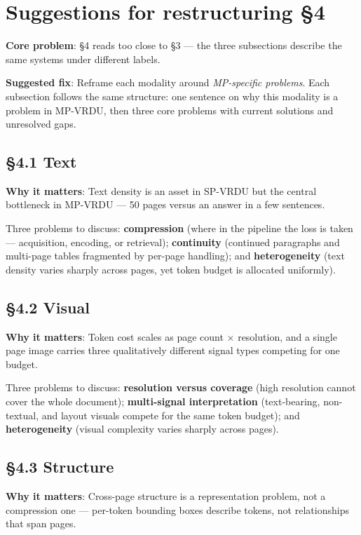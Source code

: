 \section*{Suggestions for restructuring §4}

\textbf{Core problem}: §4 reads too close to §3 --- the three subsections describe the same systems under different labels.

\textbf{Suggested fix}: Reframe each modality around \emph{MP-specific problems}. Each subsection follows the same structure: one sentence on why this modality is a problem in MP-VRDU, then three core problems with current solutions and unresolved gaps.

\subsection*{§4.1 Text}
\textbf{Why it matters}: Text density is an asset in SP-VRDU but the central bottleneck in MP-VRDU --- 50 pages versus an answer in a few sentences.

Three problems to discuss: \textbf{compression} (where in the pipeline the loss is taken --- acquisition, encoding, or retrieval); \textbf{continuity} (continued paragraphs and multi-page tables fragmented by per-page handling); and \textbf{heterogeneity} (text density varies sharply across pages, yet token budget is allocated uniformly).

\subsection*{§4.2 Visual}
\textbf{Why it matters}: Token cost scales as page count $\times$ resolution, and a single page image carries three qualitatively different signal types competing for one budget.

Three problems to discuss: \textbf{resolution versus coverage} (high resolution cannot cover the whole document); \textbf{multi-signal interpretation} (text-bearing, non-textual, and layout visuals compete for the same token budget); and \textbf{heterogeneity} (visual complexity varies sharply across pages).

\subsection*{§4.3 Structure}
\textbf{Why it matters}: Cross-page structure is a representation problem, not a compression one --- per-token bounding boxes describe tokens, not relationships that span pages.


